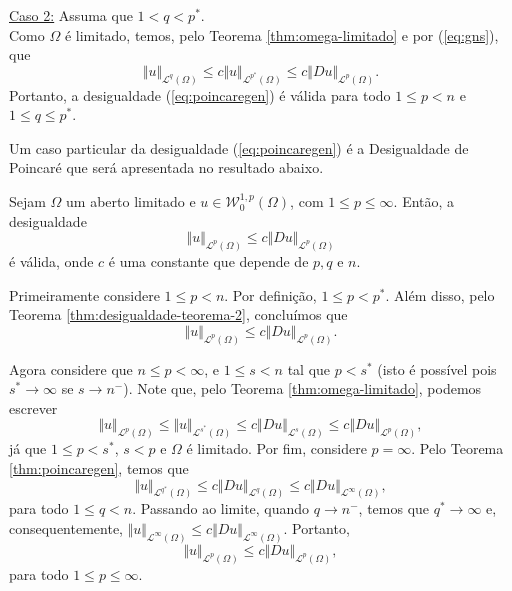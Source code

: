 \documentclass[a4paper, 11pt]{book}
\theoremstyle{definition}
\newcommand{\cL}{\mathcal{L}}
\newcommand{\cW}{\mathcal{W}}
\begin{document}
\begin{prf}
    \underline{Caso 2:} Assuma que $1 < q < p^*$.\\
    Como $\Omega$ é limitado, temos, pelo Teorema \ref{thm:omega-limitado} e por (\ref{eq:gns}), que
    \[
        \Vert u \Vert_{\cL^q(\Omega)} \leqslant c\Vert u \Vert_{\cL^{p^*}(\Omega)} \leqslant c \Vert Du \Vert_{\cL^p(\Omega)}.
    \]
    Portanto, a desigualdade (\ref{eq:poincaregen}) é válida para todo $1 \leqslant p < n$ e $1 \leqslant q \leqslant p^*$.
\end{prf}

Um caso particular da desigualdade (\ref{eq:poincaregen}) é a Desigualdade de Poincaré que será apresentada no resultado abaixo.

\begin{cbox} \label{cl:poincare}
   Sejam $\Omega$ um aberto limitado e $u \in \cW^{1,p}_0(\Omega)$, com $1 \leqslant p \leqslant \infty$. Então, a desigualdade
   \[
        \Vert u \Vert_{\cL^p(\Omega)} \leqslant c\Vert Du \Vert_{\cL^p(\Omega)}
   \]
   é válida,
   onde $c$ é uma constante que depende de $p, q$ e $n$.
\end{cbox}
\begin{prf}
    Primeiramente considere $1 \leqslant p < n$.
    Por definição, $1 \leqslant p < p^*$. Além disso, pelo Teorema \ref{thm:desigualdade-teorema-2}, concluímos que
    \[
        \Vert u \Vert_{\cL^p(\Omega)} \leqslant c \Vert Du \Vert_{\cL^p(\Omega)}.
    \]

    Agora considere que $n \leqslant p < \infty$, e $1 \leqslant s < n$ tal que $p < s^*$ (isto é possível pois $s^* \to \infty$ se $s \to n^-$).
    Note que, pelo Teorema \ref{thm:omega-limitado}, podemos escrever
    \[
        \Vert u \Vert_{\cL^p(\Omega)} \leqslant \Vert u \Vert_{\cL^{s^*}(\Omega)} \leqslant c \Vert Du \Vert_{\cL^s(\Omega)} \leqslant c \Vert Du \Vert_{\cL^p(\Omega)},
    \]
    já que $1 \leqslant p < s^*$, $s < p$ e $\Omega$ é limitado.
    Por fim, considere $p = \infty$.
    Pelo Teorema \ref{thm:poincaregen}, temos que
    \[
        \Vert u \Vert_{\cL^{q^*}(\Omega)} \leqslant c \Vert Du \Vert_{\cL^{q}(\Omega)} \leqslant c \Vert Du \Vert_{\cL^\infty(\Omega)},
    \]
    para todo $1 \leqslant q < n$.
    Passando ao limite, quando $q \to n^-$, temos que $q^* \to \infty$ e, consequentemente, $\Vert u \Vert_{\cL^\infty(\Omega)} \leqslant c \Vert Du \Vert_{\cL^\infty(\Omega)}$.
    Portanto,
    \[
        \Vert u \Vert_{\cL^p(\Omega)} \leqslant c\Vert Du \Vert_{\cL^p(\Omega)},
    \]
    para todo $1 \leqslant p \leqslant \infty$.
\end{prf}
\end{document}
